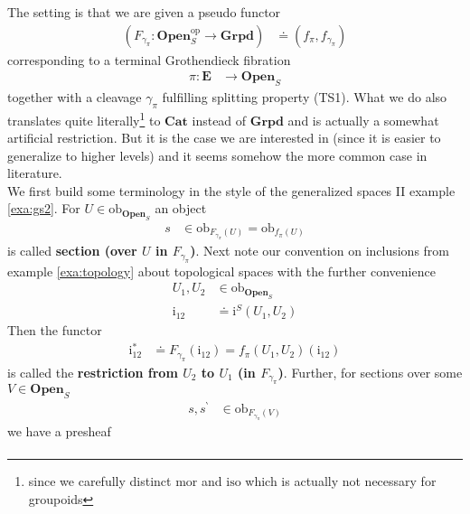 \begin{exa}
\label{exa:gs4}
The setting is that we are given a pseudo functor
\begin{align*}
  \left(
    F_{\gamma_{\pi}}
    \colon
    \mathbf{Open}_{S}^{\mathrm{op}}
    \rightarrow
    \mathbf{Grpd}
  \right)
  &\doteq
  \left(
    f_{\pi},
    f_{\gamma_{\pi}}
  \right)
\end{align*}
corresponding to a terminal Grothendieck fibration
\begin{align*}
  \pi
  \colon
  \mathbf{E}
  &\rightarrow
  \mathbf{Open}_{S}
\end{align*}
together with a cleavage $\gamma_{\pi}$ fulfilling splitting property (TS1). What we do also translates quite literally\footnote{since we carefully distinct $\mathrm{mor}$ and $\mathrm{iso}$ which is actually not necessary for groupoids} to $\mathbf{Cat}$ instead of $\mathbf{Grpd}$ and is actually a somewhat artificial restriction. But it is the case we are interested in (since it is easier to generalize to higher levels) and it seems somehow the more common case in literature.
\\
We first build some terminology in the style of the generalized spaces II example \ref{exa:gs2}. For $U \in \mathrm{ob}_{\mathbf{Open}_{S}}$ an object
\begin{align*}
  s
  &\in
  \mathrm{ob}_{F_{\gamma_{\pi}}(U)}
  =
  \mathrm{ob}_{f_{\pi}(U)}
\end{align*}
is called \textbf{section (over $U$ in $F_{\gamma_{\pi}}$)}. Next note our convention on inclusions from example \ref{exa:topology} about topological spaces with the further convenience
\begin{align*}
  U_{1},
  U_{2}
  &\in
  \mathrm{ob}_{\mathbf{Open}_{S}}
  \\
  \mathrm{i}_{12}
  &\doteq
  \mathrm{i}^{S}(U_{1},U_{2})
\end{align*}
Then the functor
\begin{align*}
  \mathrm{i}_{12}^{\ast}
  &\doteq
  F_{\gamma_{\pi}}(\mathrm{i}_{12})
  =
  f_{\pi}(U_{1},U_{2})(\mathrm{i}_{12})
\end{align*}
is called the \textbf{restriction from $U_{2}$ to $U_{1}$ (in $F_{\gamma_{\pi}}$)}. Further, for sections over some $V \in \mathbf{Open}_{S}$
\begin{align*}
  s,
  s^{\backprime}
  &\in
  \mathrm{ob}_{F_{\gamma_{\pi}}(V)}
\end{align*}
we have a presheaf
\begin{align*}

\end{align*}
\end{exa}
